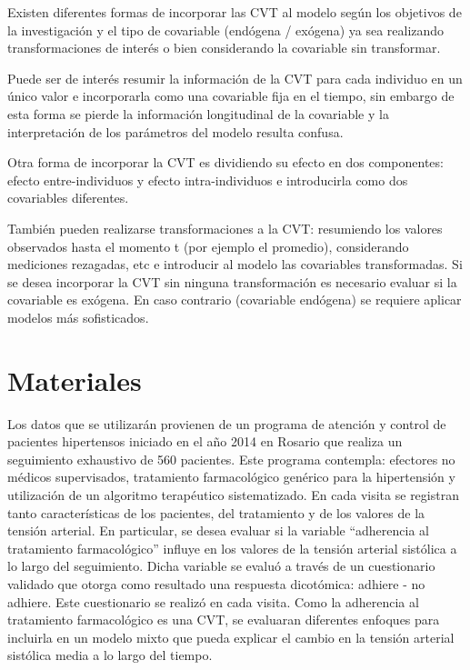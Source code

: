 \documentclass[12pt]{article}
\def\npatients{560}
\begin{document}
Existen diferentes formas de incorporar las CVT al modelo según los objetivos de la investigación y el tipo de covariable
(endógena / exógena) ya sea realizando transformaciones de interés o bien considerando la covariable sin transformar.

Puede ser de interés resumir la información de la CVT para cada individuo en un único valor e incorporarla como una covariable
fija en el tiempo, sin embargo de esta forma se pierde la información longitudinal de la covariable y la interpretación de los
parámetros del modelo resulta confusa.

Otra forma de incorporar la CVT es dividiendo su efecto en dos componentes: efecto entre-individuos y efecto intra-individuos e
introducirla como dos covariables diferentes.

También pueden realizarse transformaciones a la CVT:  resumiendo los valores observados hasta el momento t
(por ejemplo el promedio), considerando mediciones rezagadas, etc e introducir al modelo las covariables transformadas.
Si se desea incorporar la CVT sin ninguna transformación es necesario evaluar si la covariable es exógena. En caso contrario
(covariable endógena) se requiere aplicar modelos más sofisticados.

\newpage
\section{Materiales}

Los datos que se utilizarán provienen de un programa de atención y control de pacientes hipertensos iniciado en el año 2014
en Rosario que realiza un seguimiento exhaustivo de \npatients{} pacientes. Este programa contempla: efectores no médicos
supervisados, tratamiento farmacológico genérico para la hipertensión y utilización de un algoritmo terapéutico sistematizado.
En cada visita se registran tanto características de los pacientes, del tratamiento y de los valores de la tensión arterial.
En particular, se desea evaluar si la variable ``adherencia al tratamiento farmacológico'' influye en los valores de la tensión arterial
sistólica a lo largo del seguimiento. Dicha variable se evaluó a través de un cuestionario validado que otorga como resultado
una respuesta dicotómica: adhiere - no adhiere. Este cuestionario se realizó en cada visita. Como la adherencia al tratamiento
farmacológico es una CVT, se evaluaran diferentes enfoques para incluirla en un modelo mixto que pueda explicar el cambio
en la tensión arterial sistólica media a lo largo del tiempo.
\end{document}
